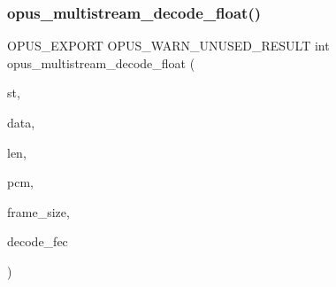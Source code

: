 \subsubsection{\texorpdfstring{opus\+\_\+multistream\+\_\+decode\+\_\+float()}{opus\_multistream\_decode\_float()}}
{\footnotesize\ttfamily O\+P\+U\+S\+\_\+\+E\+X\+P\+O\+RT O\+P\+U\+S\+\_\+\+W\+A\+R\+N\+\_\+\+U\+N\+U\+S\+E\+D\+\_\+\+R\+E\+S\+U\+LT int opus\+\_\+multistream\+\_\+decode\+\_\+float (\begin{DoxyParamCaption}\item[{\hyperlink{group__opus__multistream_gad3497495deb9a8ace82e76cd4f93e0e4}{Opus\+M\+S\+Decoder} $\ast$}]{st,  }\item[{\hyperlink{zconf_8h_a2c212835823e3c54a8ab6d95c652660e}{const} unsigned char $\ast$}]{data,  }\item[{\hyperlink{opus__types_8h_aa4d309d6f80b99dbabebc8f98879ab9a}{opus\+\_\+int32}}]{len,  }\item[{float $\ast$}]{pcm,  }\item[{int}]{frame\+\_\+size,  }\item[{int}]{decode\+\_\+fec }\end{DoxyParamCaption})}

